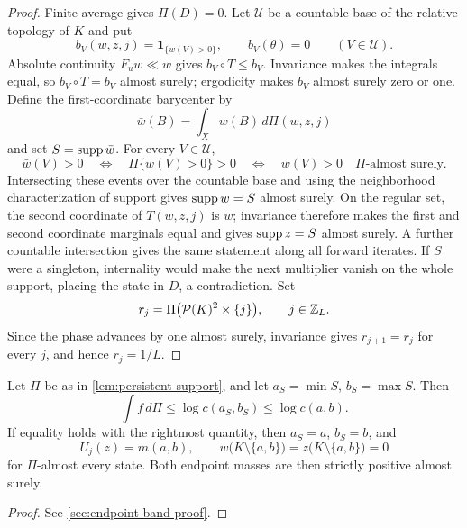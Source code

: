 \documentclass[letterpaper,twoside]{article}
\begin{document}
\begin{proof}
Finite average gives $\Pi(D)=0$.  Let $\mathcal U$ be a countable base of the
relative topology of $K$ and put
\[
 b_V(w,z,j)=\mathbf1_{\{w(V)>0\}},
 \qquad b_V(\theta)=0
 \qquad(V\in\mathcal U).
\]
Absolute continuity
$F_u w\ll w$ gives $b_V\circ T\le b_V$.  Invariance makes the integrals equal,
so $b_V\circ T=b_V$ almost surely; ergodicity makes $b_V$ almost surely zero
or one.  Define the first-coordinate barycenter by
\[
 \bar w(B)=\int_X w(B)\,d\Pi(w,z,j)
\]
and set $S=\operatorname{supp}\bar w$.  For every $V\in\mathcal U$,
\[
 \bar w(V)>0
 \quad\Longleftrightarrow\quad
 \Pi\{w(V)>0\}>0
 \quad\Longleftrightarrow\quad
 w(V)>0\quad\Pi\text{-almost surely}.
\]
Intersecting these events over the countable base and using the neighborhood
characterization of support gives $\operatorname{supp} w=S$ almost surely.  On the regular
set, the second coordinate of $T(w,z,j)$ is $w$; invariance therefore makes
the first and second coordinate marginals equal and gives $\operatorname{supp} z=S$ almost
surely.  A further countable intersection gives the same statement along all
forward iterates.  If $S$ were a singleton, internality would make the next
multiplier vanish on the whole support, placing the state in $D$, a
contradiction.
Set
\[
 r_j=\Pi\bigl(\mathcal P(K)^2\times\{j\}\bigr),
 \qquad j\in\mathbb Z_L.
\]
Since the phase advances by one almost surely, invariance gives
$r_{j+1}=r_j$ for every $j$, and hence $r_j=1/L$.
\end{proof}

\begin{lemma}\label{lem:endpoint-band}
Let $\Pi$ be as in \cref{lem:persistent-support}, and let
$a_S=\min S$, $b_S=\max S$.  Then
\begin{equation}\label{eq:invariant-bound}
 \int f\,d\Pi\le\log c(a_S,b_S)\le\log c(a,b).
\end{equation}
If equality holds with the rightmost quantity, then $a_S=a$, $b_S=b$, and
\begin{equation}\label{eq:equality-rigidity}
 U_j(z)=m(a,b),
 \qquad
 w\bigl(K\setminus\{a,b\}\bigr)
 =z\bigl(K\setminus\{a,b\}\bigr)=0
\end{equation}
for $\Pi$-almost every state.  Both endpoint masses are then strictly
positive almost surely.
\end{lemma}

\begin{proof}
See \cref{sec:endpoint-band-proof}.
\end{proof}
\end{document}
